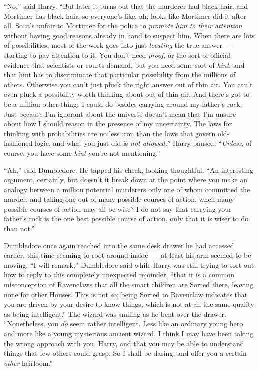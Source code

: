 ``No,'' said Harry. ``But later it turns out that the murderer had black hair, and Mortimer has black hair, so everyone's like, ah, looks like Mortimer did it after all. So it's unfair to Mortimer for the police to \emph{promote him to their attention} without having good reasons already in hand to suspect him. When there are lots of possibilities, most of the work goes into just \emph{locating} the true answer~--- starting to pay attention to it. You don't need \emph{proof}, or the sort of official evidence that scientists or courts demand, but you need some sort of \emph{hint}, and that hint has to discriminate that particular possibility from the millions of others. Otherwise you can't just pluck the right answer out of thin air. You can't even pluck a possibility worth thinking about out of thin air. And there's got to be a million other things I could do besides carrying around my father's rock. Just because I'm ignorant about the universe doesn't mean that I'm unsure about how I should reason in the presence of my uncertainty. The laws for thinking with probabilities are no less iron than the laws that govern old-fashioned logic, and what you just did is \emph{not allowed.}'' Harry paused. ``\emph{Unless}, of course, you have some \emph{hint} you're not mentioning.''

``Ah,'' said Dumbledore. He tapped his cheek, looking thoughtful. ``An interesting argument, certainly, but doesn't it break down at the point where you make an analogy between a million potential murderers only one of whom committed the murder, and taking one out of many possible courses of action, when many possible courses of action may all be wise? I do not say that carrying your father's rock is the one best possible course of action, only that it is wiser to do than not.''

Dumbledore once again reached into the same desk drawer he had accessed earlier, this time seeming to root around inside~--- at least his arm seemed to be moving. ``I will remark,'' Dumbledore said while Harry was still trying to sort out how to reply to this completely unexpected rejoinder, ``that it is a common misconception of Ravenclaws that all the smart children are Sorted there, leaving none for other Houses. This is not so; being Sorted to Ravenclaw indicates that you are driven by your desire to know things, which is not at all the same quality as being intelligent.'' The wizard was smiling as he bent over the drawer. ``Nonetheless, you \emph{do} seem rather intelligent. Less like an ordinary young hero and more like a young mysterious ancient wizard. I think I may have been taking the wrong approach with you, Harry, and that you may be able to understand things that few others could grasp. So I shall be daring, and offer you a certain \emph{other} heirloom.''

